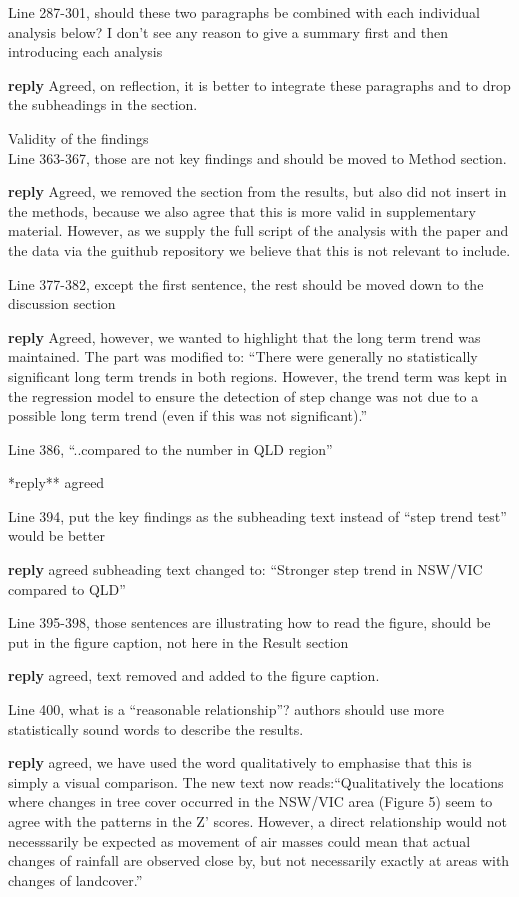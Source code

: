 \documentclass[fleqn,10pt,lineno]{wlpeerj} %
\theoremstyle{definition}
\theoremstyle{definition}
\theoremstyle{definition}
\theoremstyle{remark}
\begin{document}
Line 287-301, should these two paragraphs be combined with each
individual analysis below? I don't see any reason to give a summary
first and then introducing each analysis

\textbf{reply} Agreed, on reflection, it is better to integrate these
paragraphs and to drop the subheadings in the section.

Validity of the findings\\
Line 363-367, those are not key findings and should be moved to Method
section.

\textbf{reply} Agreed, we removed the section from the results, but also
did not insert in the methods, because we also agree that this is more
valid in supplementary material. However, as we supply the full script
of the analysis with the paper and the data via the guithub repository
we believe that this is not relevant to include.

Line 377-382, except the first sentence, the rest should be moved down
to the discussion section

\textbf{reply} Agreed, however, we wanted to highlight that the long
term trend was maintained. The part was modified to: ``There were
generally no statistically significant long term trends in both regions.
However, the trend term was kept in the regression model to ensure the
detection of step change was not due to a possible long term trend (even
if this was not significant).''

Line 386, ``..compared to the number in QLD region''

*reply** agreed

Line 394, put the key findings as the subheading text instead of ``step
trend test'' would be better

\textbf{reply} agreed subheading text changed to: ``Stronger step trend
in NSW/VIC compared to QLD''

Line 395-398, those sentences are illustrating how to read the figure,
should be put in the figure caption, not here in the Result section

\textbf{reply} agreed, text removed and added to the figure caption.

Line 400, what is a ``reasonable relationship''? authors should use more
statistically sound words to describe the results.

\textbf{reply} agreed, we have used the word qualitatively to emphasise
that this is simply a visual comparison. The new text now
reads:``Qualitatively the locations where changes in tree cover occurred
in the NSW/VIC area (Figure 5) seem to agree with the patterns in the Z'
scores. However, a direct relationship would not necesssarily be
expected as movement of air masses could mean that actual changes of
rainfall are observed close by, but not necessarily exactly at areas
with changes of landcover.''
\end{document}
